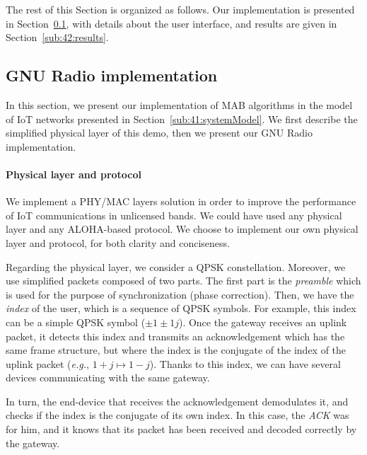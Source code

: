 The rest of this Section is organized as follows.
Our implementation is presented in Section~\ref{sub:42:implementation}, with details about the user interface, and results are given in Section~\ref{sub:42:results}.


\subsection{GNU Radio implementation}
\label{sub:42:implementation}

In this section, we present our implementation of MAB algorithms in the model of IoT networks presented in Section~\ref{sub:41:systemModel}.
We first describe the simplified physical layer of this demo, then we present our GNU Radio implementation.


\paragraph{Physical layer and protocol}

We implement a PHY/MAC layers solution in order to improve the performance of IoT communications in unlicensed bands. We could have used any physical layer and any ALOHA-based protocol.
We choose to implement our own physical layer and protocol, for both clarity and conciseness.

Regarding the physical layer, we consider a QPSK constellation. Moreover, we use simplified packets composed of two parts.
The first part is the \emph{preamble} which is used for the purpose of synchronization (phase correction).
Then, we have the \emph{index} of the user, which is a sequence of QPSK symbols.
For example, this index can be a simple QPSK symbol ($\pm1\pm1j$).
Once the gateway receives an uplink packet, it detects this index and transmits an acknowledgement which has the same frame structure, but where the index is the conjugate of the index of the uplink packet (\emph{e.g.}, $1+j \mapsto 1-j$).
Thanks to this index, we can have several devices communicating with the same gateway.

In turn, the end-device that receives the acknowledgement demodulates it, and checks if the index is the conjugate of its own index.
In this case, the \emph{ACK} was for him, and it knows that its packet has been received and decoded correctly by the gateway.


